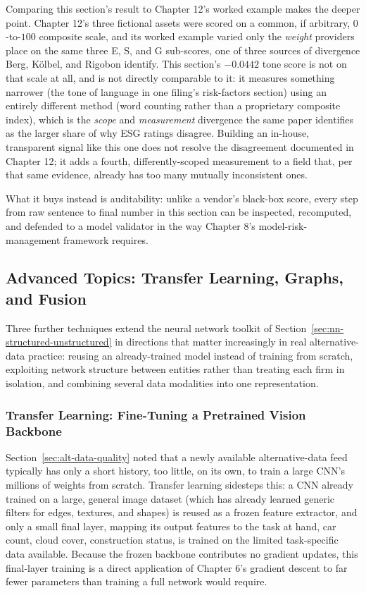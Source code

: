 \documentclass[../ai_in_finance]{subfiles}
\begin{document}
Comparing this section's result to Chapter 12's worked example makes the deeper point. Chapter 12's three fictional assets were scored on a common, if arbitrary, $0$-to-$100$ composite scale, and its worked example varied only the \emph{weight} providers place on the same three E, S, and G sub-scores, one of three sources of divergence Berg, Kölbel, and Rigobon identify. This section's $-0.0442$ tone score is not on that scale at all, and is not directly comparable to it: it measures something narrower (the tone of language in one filing's risk-factors section) using an entirely different method (word counting rather than a proprietary composite index), which is the \emph{scope} and \emph{measurement} divergence the same paper identifies as the larger share of why ESG ratings disagree. Building an in-house, transparent signal like this one does not resolve the disagreement documented in Chapter 12; it adds a fourth, differently-scoped measurement to a field that, per that same evidence, already has too many mutually inconsistent ones.

What it buys instead is auditability: unlike a vendor's black-box score, every step from raw sentence to final number in this section can be inspected, recomputed, and defended to a model validator in the way Chapter 8's model-risk-management framework requires.

\subsection{Advanced Topics: Transfer Learning, Graphs, and Fusion}
\label{sec:advanced-altdata}

Three further techniques extend the neural network toolkit of Section~\ref{sec:nn-structured-unstructured} in directions that matter increasingly in real alternative-data practice: reusing an already-trained model instead of training from scratch, exploiting network structure between entities rather than treating each firm in isolation, and combining several data modalities into one representation.

\subsubsection*{Transfer Learning: Fine-Tuning a Pretrained Vision Backbone}

Section~\ref{sec:alt-data-quality} noted that a newly available alternative-data feed typically has only a short history, too little, on its own, to train a large CNN's millions of weights from scratch. Transfer learning sidesteps this: a CNN already trained on a large, general image dataset (which has already learned generic filters for edges, textures, and shapes) is reused as a frozen feature extractor, and only a small final layer, mapping its output features to the task at hand, car count, cloud cover, construction status, is trained on the limited task-specific data available. Because the frozen backbone contributes no gradient updates, this final-layer training is a direct application of Chapter 6's gradient descent to far fewer parameters than training a full network would require.
\end{document}
